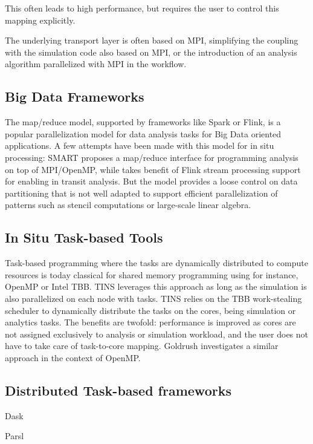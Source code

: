 This often leads to high performance, but requires the user to control this mapping explicitly.

The underlying transport layer is often based on MPI, simplifying the coupling with the simulation code also based on MPI, or the introduction of an analysis algorithm parallelized with MPI in the workflow.


\subsection{Big Data Frameworks}

The map/reduce model, supported by frameworks like Spark or Flink, is a popular parallelization model for data analysis tasks for Big Data oriented applications.
A few attempts have been made with this model for in situ processing: SMART\cite{wang_smart_2015} proposes a map/reduce interface for programming analysis on top of MPI/OpenMP, while \cite{zanuz_-transit_2018_flink} takes benefit of Flink stream processing support for enabling in transit analysis.
But the model provides a loose control on data partitioning that is not well adapted to support efficient parallelization of patterns such as stencil computations\cite{arrayUDF-SC2018} or large-scale linear algebra.


\subsection{In Situ Task-based Tools}
Task-based programming where the tasks are dynamically distributed to compute resources is today classical for shared memory programming using for instance, OpenMP or Intel TBB.
TINS\cite{yokota_tins_2018} leverages this approach as long as the simulation is also parallelized on each node with tasks.
TINS relies on the TBB work-stealing scheduler to dynamically distribute the tasks on the cores, being simulation or analytics tasks.
The benefits are twofold: performance is improved as cores are not assigned exclusively to analysis or simulation workload, and the user does not have to take care of task-to-core mapping.
Goldrush investigates a similar approach in the context of OpenMP\cite{zheng2013goldrush}.


\subsection{Distributed Task-based frameworks}

Dask 

Parsl 


